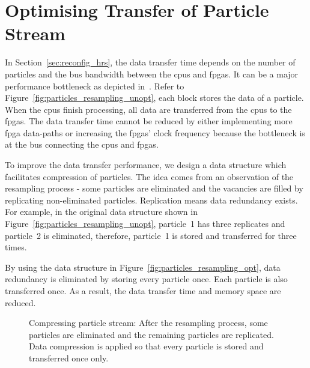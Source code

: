 \section{Optimising Transfer of Particle Stream}
\label{sec:reconfig_stream}

In Section~\ref{sec:reconfig_hrs}, the data transfer time depends on the number of particles and the bus bandwidth between the \glspl{cpu} and \glspl{fpga}.
It can be a major performance bottleneck as depicted in~\cite{chau13arc}.
Refer to Figure~\ref{fig:particles_resampling_unopt}, each block stores the data of a particle.
When the \glspl{cpu} finish processing, all data are transferred from the \glspl{cpu} to the \glspl{fpga}.
The data transfer time cannot be reduced by either implementing more \gls{fpga} data-paths or increasing the \glspl{fpga}' clock frequency because the bottleneck is at the bus connecting the \glspl{cpu} and \glspl{fpga}.

To improve the data transfer performance, we design a data structure which facilitates compression of particles.
The idea comes from an observation of the resampling process - some particles are eliminated and the vacancies are filled by replicating non-eliminated particles.
Replication means data redundancy exists.
For example, in the original data structure shown in Figure~\ref{fig:particles_resampling_unopt}, 
particle~1 has three replicates and particle~2 is eliminated, therefore, particle~1 is stored and transferred for three times.

By using the data structure in Figure~\ref{fig:particles_resampling_opt}, data redundancy is eliminated by storing every particle once.
Each particle is also transferred once.
As a result, the data transfer time and memory space are reduced.

\setcounter{subfigure}{0}
\begin{figure}[t!]
\centering
{}
\caption{Compressing particle stream: After the resampling process, some particles are eliminated and the remaining particles are replicated. Data compression is applied so that every particle is stored and transferred once only.}
\label{fig:particles_resampling}
\end{figure}

